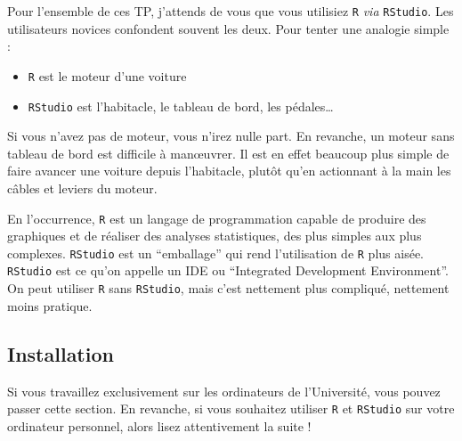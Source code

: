 \documentclass[
  a4paper,
  DIV=11,
  numbers=noendperiod,
  oneside]{scrreprt}
\providecommand{\tightlist}{%
  \setlength{\itemsep}{0pt}\setlength{\parskip}{0pt}}\usepackage{longtable,booktabs,array}
\begin{document}
Pour l'ensemble de ces TP, j'attends de vous que vous utilisiez
\texttt{R} \emph{via} \texttt{RStudio}. Les utilisateurs novices
confondent souvent les deux. Pour tenter une analogie simple :

\begin{itemize}
\tightlist
\item
  \texttt{R} est le moteur d'une voiture
\item
  \texttt{RStudio} est l'habitacle, le tableau de bord, les
  pédales\ldots{}
\end{itemize}

Si vous n'avez pas de moteur, vous n'irez nulle part. En revanche, un
moteur sans tableau de bord est difficile à manœuvrer. Il est en effet
beaucoup plus simple de faire avancer une voiture depuis l'habitacle,
plutôt qu'en actionnant à la main les câbles et leviers du moteur.

En l'occurrence, \texttt{R} est un langage de programmation capable de
produire des graphiques et de réaliser des analyses statistiques, des
plus simples aux plus complexes. \texttt{RStudio} est un ``emballage''
qui rend l'utilisation de \texttt{R} plus aisée. \texttt{RStudio} est ce
qu'on appelle un IDE ou ``Integrated Development Environment''. On peut
utiliser \texttt{R} sans \texttt{RStudio}, mais c'est nettement plus
compliqué, nettement moins pratique.

\subsection{Installation}\label{sec-install}

\begin{tcolorbox}[enhanced jigsaw, colbacktitle=quarto-callout-warning-color!10!white, left=2mm, leftrule=.75mm, titlerule=0mm, bottomtitle=1mm, colback=white, breakable, arc=.35mm, bottomrule=.15mm, toprule=.15mm, toptitle=1mm, opacitybacktitle=0.6, title=\textcolor{quarto-callout-warning-color}{\faExclamationTriangle}\hspace{0.5em}{Avertissement}, coltitle=black, rightrule=.15mm, opacityback=0, colframe=quarto-callout-warning-color-frame]

Si vous travaillez exclusivement sur les ordinateurs de l'Université,
vous pouvez passer cette section. En revanche, si vous souhaitez
utiliser \texttt{R} et \texttt{RStudio} sur votre ordinateur personnel,
alors lisez attentivement la suite !

\end{tcolorbox}
\end{document}
